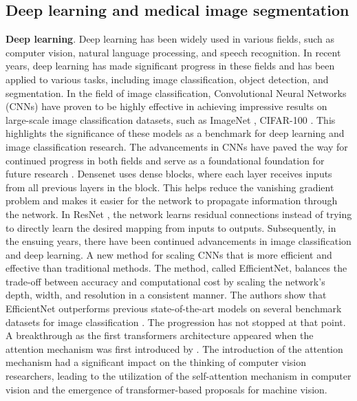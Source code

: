 \documentclass{article}
\begin{document}
\subsection{Deep learning and medical image segmentation}
\textbf{Deep learning}. Deep learning has been widely used in various fields, such as computer vision, natural language processing, and speech recognition. In recent years, deep learning has made significant progress in these fields and has been applied to various tasks, including image classification, object detection, and segmentation. In the field of image classification, Convolutional Neural Networks (CNNs) have proven to be highly effective in achieving impressive results on large-scale image classification datasets, such as ImageNet \cite{deng2009imagenet}, CIFAR-100 \cite{cifar100}. This highlights the significance of these models as a benchmark for deep learning and image classification research. The advancements in CNNs have paved the way for continued progress in both fields and serve as a foundational foundation for future research \cite{Densenet, Resnet}. Densenet \cite{Densenet} uses dense blocks, where each layer receives inputs from all previous layers in the block. This helps reduce the vanishing gradient problem and makes it easier for the network to propagate information through the network. In ResNet \cite{Resnet}, the network learns residual connections instead of trying to directly learn the desired mapping from inputs to outputs. Subsequently, in the ensuing years, there have been continued advancements in image classification and deep learning. A new method for scaling CNNs that is more efficient and effective than traditional methods. The method, called EfficientNet, balances the trade-off between accuracy and computational cost by scaling the network's depth, width, and resolution in a consistent manner. The authors show that EfficientNet outperforms previous state-of-the-art models on several benchmark datasets for image classification \cite{efficientnet}. The progression has not stopped at that point. A breakthrough as the first transformers architecture appeared when the attention mechanism was first introduced by \cite{attentionisall}. The introduction of the attention mechanism had a significant impact on the thinking of computer vision researchers, leading to the utilization of the self-attention mechanism in computer vision and the emergence of transformer-based proposals for machine vision. 
\end{document}

